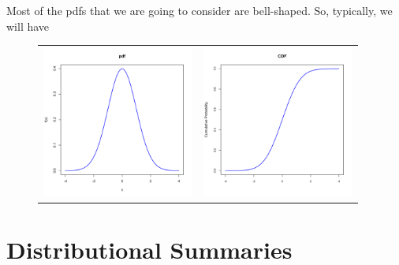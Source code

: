 \documentclass[notes=show,smaller,handout]{beamer}\usepackage[]{graphicx}\usepackage[]{color}
\begin{document}
\begin{frame}{\secname}
  Most of the pdfs that we are going to consider are bell-shaped. So, typically, we will have
  \begin{figure}[h]
  \begin{center}
  \begin{tabular}{cc}
  \includegraphics[width=5cm, height=5.cm]{img/R_bell_pdf} & \includegraphics[width=5cm, height=5cm]{img/R_bell_CDF.pdf} \\
  \end{tabular}
  \end{center}
  \par
  \end{figure}
\end{frame}

\section{Distributional Summaries}
\end{document}
